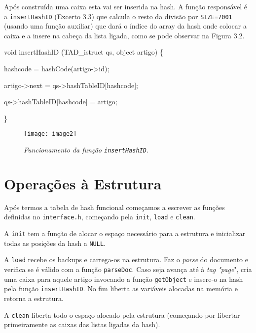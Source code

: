\documentclass[a4paper,12pt]{report}
\newcommand\tab[1][1cm]{\hspace*{#1}}
\begin{document}
Após construída uma caixa esta vai ser inserida na hash. A função responsável é a {\tt insertHashID} (Excerto 3.3) que calcula o resto da divisão por {\tt SIZE=7001} (usando uma função auxiliar) que dará o índice do array da hash onde colocar a caixa e a insere na cabeça da lista ligada, como se pode observar na Figura 3.2.


\begin{tcolorbox}[width=\textwidth,colback={darkgray},title={\sf Excerto 3.3: {\tt insertHashID}.},outer arc=2mm,colupper=white]{\footnotesize\tt
		
		{\color{newpink}void} {\color{lightblue}insertHashID} (TAD\_istruct qs, object artigo) \{
		
		\tab {\color{newpink}int} hashcode {\color{newpink}=} {\color{lightblue}hashCode}(artigo->{\color{deadred}id});
		
		\tab artigo->{\color{deadred}next} {\color{newpink}=} qs->{\color{deadred}hashTableID}[hashcode];
		
		\tab qs->{\color{deadred}hashTableID}[hashcode] {\color{newpink}=} artigo;
		
		\}		 
	}
\end{tcolorbox} 

\begin{figure}[h]
	\centering
	\texttt{[image: image2]}
	\caption{\small\sl Funcionamento da função {\tt insertHashID}.}
	\captionsetup[figure]{list=yes}
\end{figure}


\section{Operações à Estrutura}

Após termos a tabela de hash funcional começamos a escrever as funções definidas no {\tt interface.h}, começando pela {\tt init}, {\tt load} e {\tt clean}.

A {\tt init} tem a função de alocar o espaço necessário para a estrutura e inicializar todas as posições da hash a {\tt NULL}.

A {\tt load} recebe os backups e carrega-os na estrutura. Faz o {\sl parse} do documento e verifica se é válido com a função {\tt parseDoc}. Caso seja avança até à {\sl tag "page}", cria uma caixa para aquele artigo invocando a função {\tt getObject} e insere-o na hash pela função {\tt insertHashID}. No fim liberta as variáveis alocadas na memória e retorna a estrutura.

A {\tt clean} liberta todo o espaço alocado pela estrutura (começando por libertar primeiramente as caixas das listas ligadas da hash).
\end{document}
